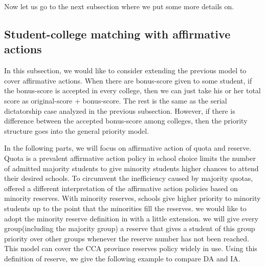   

Now let us go to the next subsection where we put some more details on.

\subsection{Student-college matching with affirmative actions}

In this subsection, we would like to consider extending the previous
model to cover affirmative actions.
When there are bonus-score given to some student, if the bonus-score
is accepted in every college, then we can just take his or her total score as
original-score + bonus-score. The rest is the same as the serial
dictatorship case analyzed in the previous subsection. However, if
there is difference between the accepted bonus-score
among colleges, then the priority structure goes into the
general priority model.

In the following parts, we will focus on affirmative action of quota and reserve. Quota is 
a prevalent affirmative action policy in school choice limits the number of
admitted majority students to give minority students higher chances to attend their
desired schools. To circumvent the inefficiency caused by majority
quotas, \parencite{Hafalir2013} offered a different interpretation of the affirmative action policies based on
minority reserves. With minority reserves, schools give higher priority to
minority students up to the point that the minorities fill the reserves.
we would like to adopt the minority reserve definition
in \parencite{Hafalir2013} with a little extension. we will give every group(including the majority group) a reserve that gives a student of this group priority
over other groups whenever the reserve number has not been reached. This model can cover the CCA province reserves policy widely in use.
Using this definition of reserve, we give the following
example to compare DA and IA.

